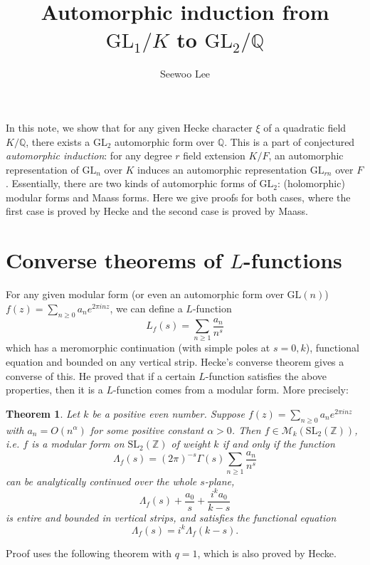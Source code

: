 \documentclass{article}
\title{Automorphic induction from $\mathrm{GL}_{1}/K$ to $\mathrm{GL}_{2}/\mathbb{Q}$}
\author{Seewoo Lee}
\newtheorem{theorem}{Theorem}
\newcommand{\GL}{\mathrm{GL}}
\newcommand{\SL}{\mathrm{SL}}
\begin{document}
\maketitle

In this note, we show that for any given Hecke character $\xi$ of a quadratic field $K/\mathbb{Q}$, there exists a $\GL_{2}$ automorphic form over $\mathbb{Q}$. This is a part of conjectured \emph{automorphic induction}: for any degree $r$ field extension $K/F$, an automorphic representation of $\GL_{n}$ over $K$ induces an automorphic representation $\GL_{rn}$ over $F$. 
Essentially, there are two kinds of automorphic forms of $\GL_{2}$: (holomorphic) modular forms and Maass forms. Here we give proofs for both cases, where the first case is proved by Hecke and the second case is proved by Maass. 


\section{Converse theorems of $L$-functions}
For any given modular form (or even an automorphic form over $\GL(n)$) $f(z) = \sum_{n\geq 0}a_{n}e^{2\pi i n z}$, we can define a $L$-function 
$$
L_{f}(s) = \sum_{n\geq 1} \frac{a_{n}}{n^{s}}
$$
which has a meromorphic continuation (with simple poles at $s = 0, k$), functional equation and bounded on any vertical strip. 
Hecke's converse theorem gives a converse of this. He proved that if a certain $L$-function satisfies the above properties, then it is a $L$-function comes from a modular form. 
More precisely:
\begin{theorem}
Let $k$ be a positive even number. Suppose $f(z) = \sum_{n\geq 0}a_{n}e^{2\pi i n z}$ with $a_{n} = O(n^{\alpha})$ for some positive constant $\alpha >0$. 
Then $f\in \mathcal{M}_{k}(\SL_{2}(\mathbb{Z}))$, i.e. $f$ is a modular form on $\SL_{2}(\mathbb{Z})$ of weight $k$ if and only if the function 
$$
\Lambda_{f}(s) = (2\pi)^{-s} \Gamma(s) \sum_{n\geq 1} \frac{a_{n}}{n^{s}}
$$
can be analytically continued over the whole $s$-plane, 
$$
\Lambda_{f}(s) + \frac{a_{0}}{s} + \frac{i^{k}a_{0}}{k-s}
$$
is entire and bounded in vertical strips, and satisfies the functional equation $$\Lambda_{f}(s) = i^{k} \Lambda_{f}(k-s).$$
\end{theorem}
Proof uses the following theorem with $q=1$, which is also proved by Hecke. 
\end{document}
